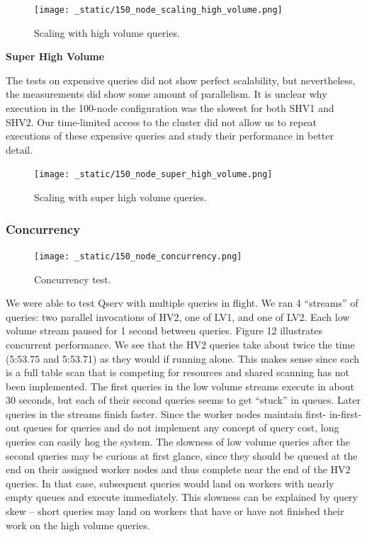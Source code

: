 \documentclass[DM,lsstdraft,toc]{lsstdoc}
\begin{document}
\begin{figure}[H]
\centering
\texttt{[image: \_static/150\_node\_scaling\_high\_volume.png]}
\caption{Scaling with high volume queries.}
\end{figure}

\textbf{Super High Volume}

The tests on expensive queries did not show perfect scalability, but
nevertheless, the measurements did show some amount of parallelism. It
is unclear why execution in the 100-node configuration was the slowest
for both SHV1 and SHV2. Our time-limited access to the cluster did not
allow us to repeat executions of these expensive queries and study their
performance in better detail.

\begin{figure}[H]
\centering
\texttt{[image: \_static/150\_node\_super\_high\_volume.png]}
\caption{Scaling with super high volume queries.}
\end{figure}

\subsubsection{Concurrency}\label{concurrency}

\begin{figure}[H]
\centering
\texttt{[image: \_static/150\_node\_concurrency.png]}
\caption{Concurrency test.}
\end{figure}

We were able to test Qserv with multiple queries in flight. We ran 4
``streams'' of queries: two parallel invocations of HV2, one of LV1, and
one of LV2. Each low volume stream paused for 1 second between queries.
Figure 12 illustrates concurrent performance. We see that the HV2
queries take about twice the time (5:53.75 and 5:53.71) as they would if
running alone. This makes sense since each is a full table scan that is
competing for resources and shared scanning has not been implemented.
The first queries in the low volume streams execute in about 30 seconds,
but each of their second queries seems to get ``stuck'' in queues. Later
queries in the streams finish faster. Since the worker nodes maintain
first- in-first-out queues for queries and do not implement any concept
of query cost, long queries can easily hog the system. The slowness of
low volume queries after the second queries may be curious at first
glance, since they should be queued at the end on their assigned worker
nodes and thus complete near the end of the HV2 queries. In that case,
subsequent queries would land on workers with nearly empty queues and
execute immediately. This slowness can be explained by query skew --
short queries may land on workers that have or have not finished their
work on the high volume queries.
\end{document}
